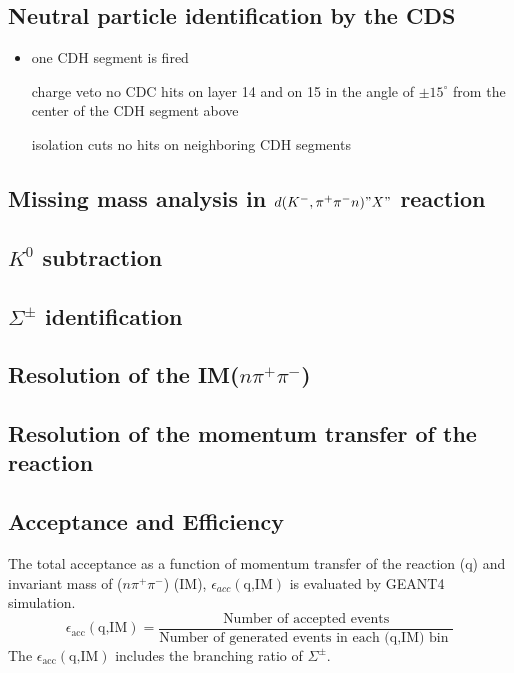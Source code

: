 \subsection{Neutral particle identification by the CDS}
\begin{itemize}
\item one CDH segment is fired
\item [charge veto] no CDC hits on layer 14 and on 15 in the angle of $\pm 15^\circ$ from the center of the CDH segment above
\item [isolation cuts] no hits on neighboring CDH segments
\end{itemize}

\subsection{Missing mass analysis in $d(K^-,\pi^+\pi^-n)"X"$ reaction}

\subsection{$K^0$ subtraction}


\subsection{$\Sigma^{\pm}$ identification}

\subsection{Resolution of the IM($n\pi^{+}\pi^{-}$)}

\subsection{Resolution of the momentum transfer of the reaction}

\subsection{Acceptance and Efficiency}
The total acceptance as a function of momentum transfer of the reaction (q) and invariant mass of ($n\pi^+\pi^-$) (IM), $\epsilon_{acc}(\mbox{q,IM})$ is evaluated by GEANT4 simulation.
\[
\epsilon_{\mbox{acc}}(\mbox{q,IM}) = \frac{\mbox{Number of accepted events}}{\mbox{Number of generated events in each (q,IM) bin }}
\]
The $\epsilon_{\mbox{acc}}(\mbox{q,IM})$ includes the branching ratio of $\Sigma^{\pm}$. 



